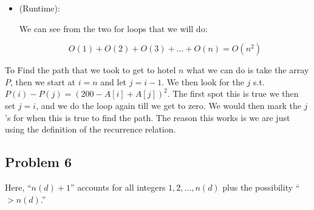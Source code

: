 \documentclass[12pt, letterpaper]{article}
\theoremstyle{definition}
\begin{document}
\begin{enumerate}[(a)]
\begin{itemize}
        For the inductive step, assume that for all $k \leq i-1$, the computed values $P[k]$ correctly represent the minimum penalty required to reach $A[k]$. The algorithm updates $P[i]$ using the recurrence:
        \[
        P(i) = \min_{0 \leq j \leq i} \left( (200 - A[i] + A[j])^2 + P[j] \right).
        \]
        Since this equation correctly defines the minimum penalty needed to reach $A[i]$, and since the inner loop ensures that all possible transitions from previous states $j$ are considered, the computed $P[i]$ is optimal. The algorithm processes states in increasing order of $i$, ensuring that all dependencies are resolved before $P[i]$ is computed. Thus, by induction, all values $P[i]$ are correctly computed, and the final result $P[n]$ is the minimum penalty to reach $A[n]$.

        \item (Runtime):
        
        We can see from the two for loops that we will do:

        \[O(1)+O(2)+O(3)+\dots+O(n)=O(n^2)\]
    \end{itemize}

    To Find the path that we took to get to hotel $n$ what we can do is take the array $P$, then we start at $i=n$ and let $j=i-1$. We then look for the $j$ s.t. $P(i)-P(j)=(200-A[i]+A[j])^2$. The first spot this is true we then set $j=i$, and we do the loop again till we get to zero. We would then mark the $j$'s for when this is true to find the path. The reason this works is we are just using the definition of the recurrence relation.
\end{enumerate}

\newpage
\subsection*{Problem 6}
Here, ``$n(d)+1$'' accounts for all integers $1,2,\dots,n(d)$ plus the possibility ``$>n(d)$.''
\end{document}
